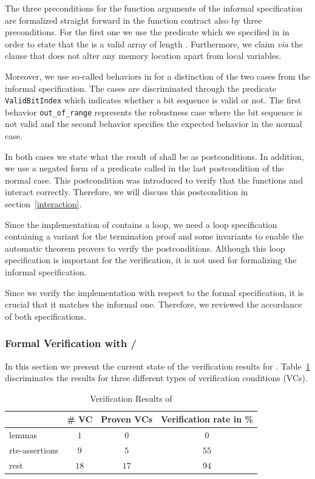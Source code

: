 The three preconditions for the function arguments of the informal specification 
are formalized straight forward in the function contract also by three preconditions.
For the first one we use the predicate 
which we specified in \acsl in order to state that the 
is a valid array of length .
Furthermore, we claim {\it via} the  clause 
that \peek does not alter any memory location
apart from local variables.

Moreover, we use so-called behaviors in \acsl for a distinction of the two cases
from the informal specification.
The cases are discriminated through the predicate \texttt{ValidBitIndex}
which indicates whether a bit sequence is valid or not.
The first behavior \texttt{out\_of\_range} represents the robustness 
case where the bit sequence is not valid and 
the second behavior specifies the expected behavior in the normal case.

In both cases we state what the result of \peek shall be 
as postconditions. In addition, we use a negated form of
a predicate called  in the last postcondition of
the normal case. This postcondition was introduced to verify
that the functions \peek and \poke interact correctly.
Therefore, we will discuss this postcondition in section~\ref{interaction}.

Since the implementation of \peek contains a loop,
we need a loop specification containing a variant for the termination
proof and some invariants to enable the automatic theorem provers
to verify the postconditions.
Although this loop specification is important for the verification,
it is not used for formalizing the informal specification.

Since we verify the implementation with respect to the formal specification, 
it is crucial that it matches the informal one. 
Therefore, we reviewed the accordance of both specifications.

\subsubsection{Formal Verification with \framac/\wpframac}
\label{verification-peek}

In this section we present the current state of the verification results 
for \peek.
Table~\ref{tab:results-peek} discriminates the results for
three different types of verification conditions (VCs).

\begin{table}[hbt]
  \centering
  \begin{tabular}[htb]{lccc}
    \toprule
     & \# VC & Proven VCs & Verification rate in \%\\
    \midrule
    lemmas & $1$ &$0$ & $0$ \\
    rte-assertions&$9$&$5$&$55$\\
    rest &$18$ &$17$&$94$\\
    \bottomrule
  \end{tabular}
  \caption{Verification Results of \peek}
  \label{tab:results-peek}
\end{table}


